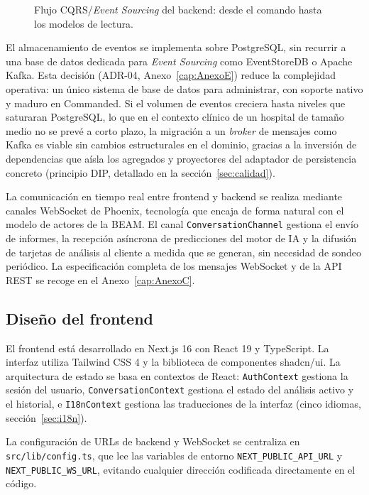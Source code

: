 \begin{figure}[ht]
\centering
\resizebox{\textwidth}{!}{}
\caption{Flujo CQRS/\emph{Event Sourcing} del backend: desde el comando hasta los modelos de lectura.}
\label{fig:cqrs-flujo}
\end{figure}

El almacenamiento de eventos se implementa sobre PostgreSQL, sin recurrir a una base de datos dedicada para \emph{Event Sourcing} como EventStoreDB o Apache Kafka. Esta decisión (ADR-04, Anexo~\ref{cap:AnexoE}) reduce la complejidad operativa: un único sistema de base de datos para administrar, con soporte nativo y maduro en Commanded. Si el volumen de eventos creciera hasta niveles que saturaran PostgreSQL, lo que en el contexto clínico de un hospital de tamaño medio no se prevé a corto plazo, la migración a un \emph{broker} de mensajes como Kafka es viable sin cambios estructurales en el dominio, gracias a la inversión de dependencias que aísla los agregados y proyectores del adaptador de persistencia concreto (principio DIP, detallado en la sección~\ref{sec:calidad}).

La comunicación en tiempo real entre frontend y backend se realiza mediante canales WebSocket de Phoenix, tecnología que encaja de forma natural con el modelo de actores de la BEAM. El canal \texttt{ConversationChannel} gestiona el envío de informes, la recepción asíncrona de predicciones del motor de IA y la difusión de tarjetas de análisis al cliente a medida que se generan, sin necesidad de sondeo periódico. La especificación completa de los mensajes WebSocket y de la API REST se recoge en el Anexo~\ref{cap:AnexoC}.

\subsection{Diseño del frontend}

El frontend está desarrollado en Next.js 16 con React 19 y TypeScript. La interfaz utiliza Tailwind CSS 4 y la biblioteca de componentes shadcn/ui. La arquitectura de estado se basa en contextos de React: \texttt{AuthContext} gestiona la sesión del usuario, \texttt{ConversationContext} gestiona el estado del análisis activo y el historial, e \texttt{I18nContext} gestiona las traducciones de la interfaz (cinco idiomas, sección~\ref{sec:i18n}).

La configuración de URLs de backend y WebSocket se centraliza en \texttt{src/lib/config.ts}, que lee las variables de entorno \texttt{NEXT\_PUBLIC\_API\_URL} y \texttt{NEXT\_PUBLIC\_WS\_URL}, evitando cualquier dirección codificada directamente en el código.

